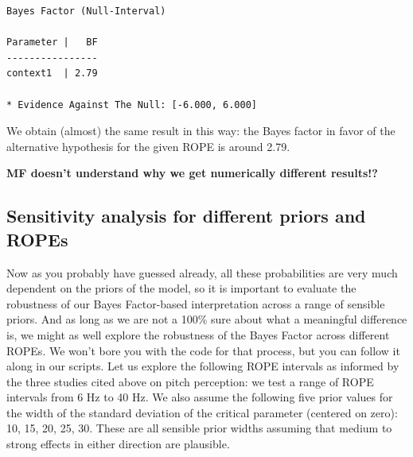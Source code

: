 \documentclass[
  doc,
  floatsintext,
  longtable,
  nolmodern,
  notxfonts,
  notimes,
  colorlinks=true,linkcolor=blue,citecolor=blue,urlcolor=blue]{apa7}
\begin{document}
\begin{verbatim}
Bayes Factor (Null-Interval)

Parameter |   BF
----------------
context1  | 2.79

* Evidence Against The Null: [-6.000, 6.000]
\end{verbatim}

We obtain (almost) the same result in this way: the Bayes factor in
favor of the alternative hypothesis for the given ROPE is around 2.79.

\textbf{MF doesn't understand why we get numerically different
results!?}

\subsection{Sensitivity analysis for different priors and
ROPEs}\label{sensitivity-analysis-for-different-priors-and-ropes}

Now as you probably have guessed already, all these probabilities are
very much dependent on the priors of the model, so it is important to
evaluate the robustness of our Bayes Factor-based interpretation across
a range of sensible priors. And as long as we are not a 100\% sure about
what a meaningful difference is, we might as well explore the robustness
of the Bayes Factor across different ROPEs. We won't bore you with the
code for that process, but you can follow it along in our scripts. Let
us explore the following ROPE intervals as informed by the three studies
cited above on pitch perception: we test a range of ROPE intervals from
6 Hz to 40 Hz. We also assume the following five prior values for the
width of the standard deviation of the critical parameter (centered on
zero): 10, 15, 20, 25, 30. These are all sensible prior widths assuming
that medium to strong effects in either direction are plausible.
\end{document}
